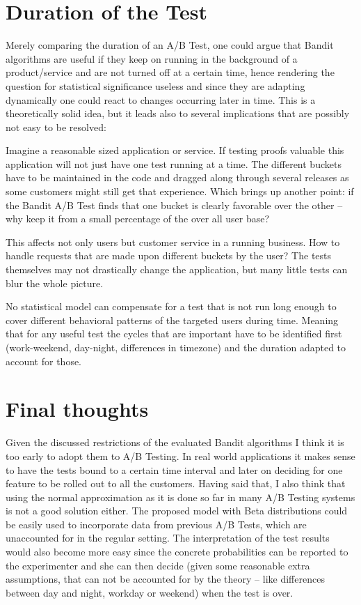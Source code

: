 \documentclass[main.tex]{subfiles}
\begin{document}
\section{Duration of the Test}
Merely comparing the duration of an A/B Test, one could argue that Bandit algorithms are useful if they keep on running in the background of a product/service and are not turned off at a certain time, hence rendering the question for statistical significance useless and since they are adapting dynamically one could react to changes occurring later in time. This is a theoretically solid idea, but it leads also to several implications that are possibly not easy to be resolved: 

Imagine a reasonable sized application or service. If testing proofs valuable this application will not just have one test running at a time. The different buckets have to be maintained in the code and dragged along through several releases as some customers might still get that experience. Which brings up another point: if the Bandit A/B Test finds that one bucket is clearly favorable over the other -- why keep it from a small percentage of the over all user base?

This affects not only users but customer service in a running business. How to handle requests that are made upon different buckets by the user? The tests themselves may not drastically change the application, but many little tests can blur the whole picture.

No statistical model can compensate for a test that is not run long enough to cover different behavioral patterns of the targeted users during time. Meaning that for any useful test the cycles that are important have to be identified first (work-weekend, day-night, differences in timezone) and the duration adapted to account for those.

\section{Final thoughts}
Given the discussed restrictions of the evaluated Bandit algorithms I think it is too early to adopt them to A/B Testing. In real world applications it makes sense to have the tests bound to a certain time interval and later on deciding for one feature to be rolled out to all the customers. Having said that, I also think that using the normal approximation as it is done so far in many A/B Testing systems is not a good solution either. The proposed model with Beta distributions could be easily used to incorporate data from previous A/B Tests, which are unaccounted for in the regular setting. The interpretation of the test results would also become more easy since the concrete probabilities can be reported to the experimenter and she can then decide (given some reasonable extra assumptions, that can not be accounted for by the theory -- like differences between day and night, workday or weekend) when the test is over.
\end{document}
